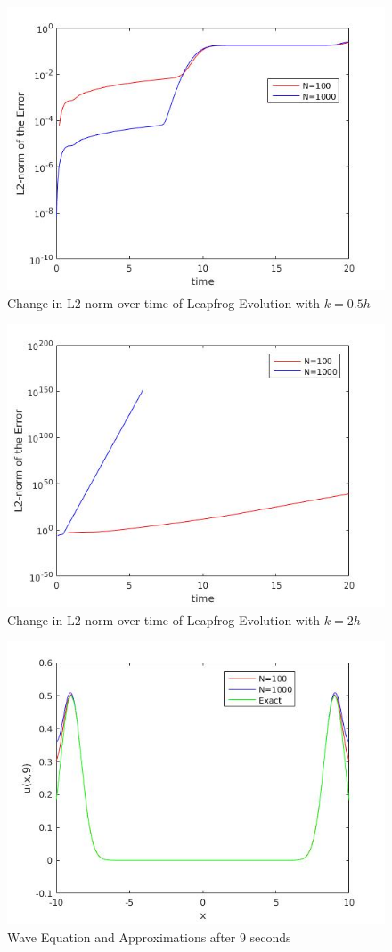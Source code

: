 \begin{figure}[H] 
 \includegraphics[scale=0.5]{Images/leapfrog_wave_l2_halfk.jpg}
 \caption{Change in L2-norm over time of Leapfrog Evolution with $k = 0.5h$}
 \label{leapfrog_wave_l2_halfk}
\end{figure}
\begin{figure}[H] 
 \includegraphics[scale=0.5]{Images/leapfrog_wave_l2_2k.jpg}
 \caption{Change in L2-norm over time of Leapfrog Evolution with $k = 2h$}
 \label{leapfrog_wave_l2_2k}
\end{figure}
\begin{figure}[H] 
 \includegraphics[scale=0.5]{Images/leapfrog_wave.jpg}
 \caption{Wave Equation and Approximations after 9 seconds}
 \label{leapfrog_wave}
\end{figure}
